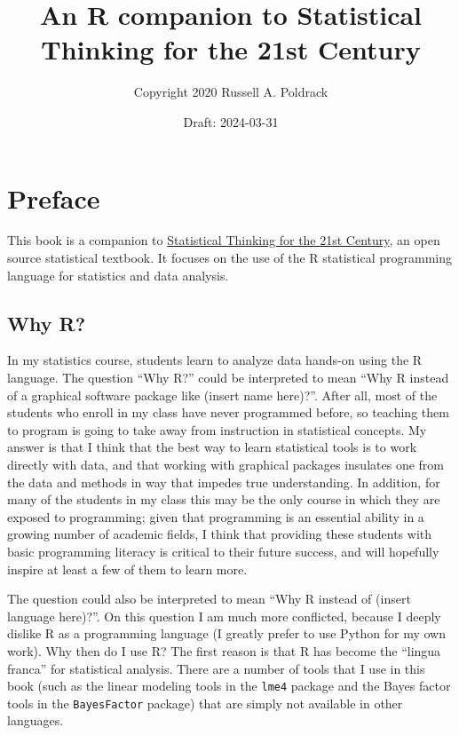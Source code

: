 \documentclass[
  12pt,
]{book}
\title{An R companion to Statistical Thinking for the 21st Century}
\author{Copyright 2020 Russell A. Poldrack}
\date{Draft: 2024-03-31}
\begin{document}
\maketitle

{
\setcounter{tocdepth}{1}
\tableofcontents
}
\hypertarget{preface}{%
\chapter*{Preface}\label{preface}}

This book is a companion to \href{https://statsthinking21.org/}{Statistical Thinking for the 21st Century}, an open source statistical textbook. It focuses on the use of the R statistical programming language for statistics and data analysis.

\hypertarget{why-r}{%
\section{Why R?}\label{why-r}}

In my statistics course, students learn to analyze data hands-on using the R language. The question ``Why R?'' could be interpreted to mean ``Why R instead of a graphical software package like (insert name here)?''. After all, most of the students who enroll in my class have never programmed before, so teaching them to program is going to take away from instruction in statistical concepts. My answer is that I think that the best way to learn statistical tools is to work directly with data, and that working with graphical packages insulates one from the data and methods in way that impedes true understanding. In addition, for many of the students in my class this may be the only course in which they are exposed to programming; given that programming is an essential ability in a growing number of academic fields, I think that providing these students with basic programming literacy is critical to their future success, and will hopefully inspire at least a few of them to learn more.

The question could also be interpreted to mean ``Why R instead of (insert language here)?''. On this question I am much more conflicted, because I deeply dislike R as a programming language (I greatly prefer to use Python for my own work). Why then do I use R? The first reason is that R has become the ``lingua franca'' for statistical analysis. There are a number of tools that I use in this book (such as the linear modeling tools in the \texttt{lme4} package and the Bayes factor tools in the \texttt{BayesFactor} package) that are simply not available in other languages.
\end{document}
